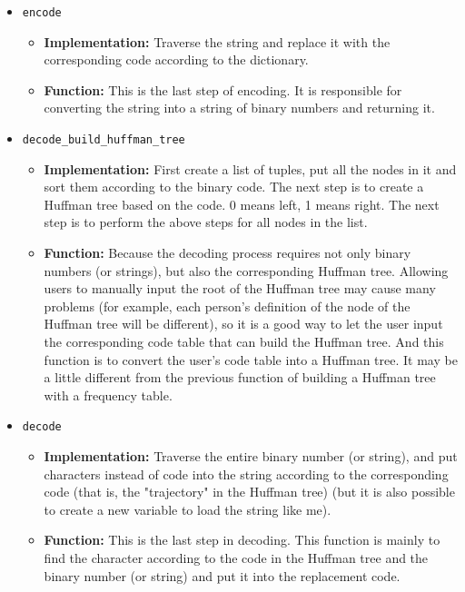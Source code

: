 \documentclass{article}
\begin{document}
\begin{itemize}
\begin {itemize}
        \end{itemize}
    \item \texttt{encode}
        \begin {itemize}
            \item \textbf{Implementation:} Traverse the string and replace it with the corresponding code according to the dictionary.
            \item \textbf{Function:} This is the last step of encoding. It is responsible for converting the string into a string of binary numbers and returning it.
        \end{itemize}
    \item \texttt{decode\_build\_huffman\_tree}
        \begin {itemize}
            \item \textbf{Implementation:} First create a list of tuples, put all the nodes in it and sort them according to the binary code. The next step is to create a Huffman tree based on the code. 0 means left, 1 means right. The next step is to perform the above steps for all nodes in the list.
            \item \textbf{Function:} Because the decoding process requires not only binary numbers (or strings), but also the corresponding Huffman tree. Allowing users to manually input the root of the Huffman tree may cause many problems (for example, each person's definition of the node of the Huffman tree will be different), so it is a good way to let the user input the corresponding code table that can build the Huffman tree. And this function is to convert the user's code table into a Huffman tree. It may be a little different from the previous function of building a Huffman tree with a frequency table.
        \end{itemize}
    \item \texttt{decode}
        \begin {itemize}
            \item \textbf{Implementation:} Traverse the entire binary number (or string), and put characters instead of code into the string according to the corresponding code (that is, the "trajectory" in the Huffman tree) (but it is also possible to create a new variable to load the string like me).
            \item \textbf{Function:} This is the last step in decoding. This function is mainly to find the character according to the code in the Huffman tree and the binary number (or string) and put it into the replacement code.
        \end{itemize}

\end{itemize}
\end{document}
